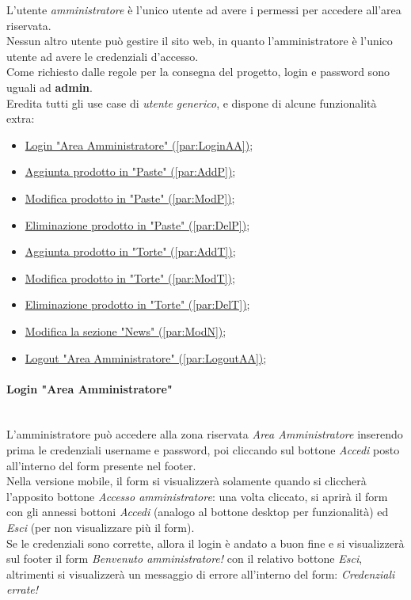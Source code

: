 L'utente \emph{amministratore} è l'unico utente ad avere i permessi per accedere all'area riservata.\\ 
Nessun altro utente può gestire il sito web, in quanto l'amministratore è l'unico utente ad avere le credenziali d'accesso.\\  
Come richiesto dalle regole per la consegna del progetto, login e password sono uguali ad \textbf{admin}.\\ 
Eredita tutti gli use case di \textit{utente generico}, e dispone di alcune funzionalità extra:
\begin{itemize}
	\item \hyperref[par:LoginAA]{ Login "Area Amministratore" (\ref{par:LoginAA})};
	\item \hyperref[par:AddP]{ Aggiunta prodotto in "Paste" (\ref{par:AddP})};
	\item \hyperref[par:ModP]{ Modifica prodotto in "Paste" (\ref{par:ModP})};
	\item \hyperref[par:DelP]{ Eliminazione prodotto in "Paste" (\ref{par:DelP})};
	\item \hyperref[par:AddT]{ Aggiunta prodotto in "Torte" (\ref{par:AddT})};
	\item \hyperref[par:ModT]{ Modifica prodotto in "Torte" (\ref{par:ModT})};
	\item \hyperref[par:DelT]{ Eliminazione prodotto in "Torte" (\ref{par:DelT})};
	\item \hyperref[par:ModN]{ Modifica la sezione "News" (\ref{par:ModN})};
	\item \hyperref[par:LogoutAA]{ Logout "Area Amministratore" (\ref{par:LogoutAA})};
\end{itemize}

\paragraph{Login "Area Amministratore"}\mbox{}\\
\label{par:LoginAA}
L'amministratore può accedere alla zona riservata \emph{Area Amministratore} inserendo prima le credenziali username e password, poi cliccando sul bottone \emph{Accedi} 
posto all'interno del form presente nel footer.\\ 
Nella versione mobile, il form si visualizzerà solamente quando si cliccherà l'apposito bottone \emph{Accesso amministratore}: una volta cliccato, si aprirà il form con 
gli annessi bottoni \emph{Accedi} (analogo al bottone desktop per funzionalità) ed \emph{Esci} (per non visualizzare più il form).\\ 
Se le credenziali sono corrette, allora il login è andato a buon fine e si visualizzerà sul footer il form \emph{Benvenuto amministratore!} con il relativo bottone \emph{Esci}, 
altrimenti si visualizzerà un messaggio di errore all'interno del form: \emph{Credenziali errate!}

